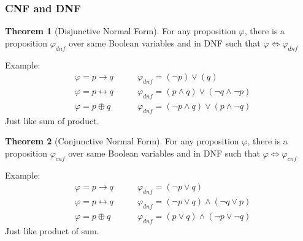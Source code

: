 \documentclass{article}
\theoremstyle{definition}
\newtheorem{theorem}{Theorem}
\begin{document}
\subsubsection{CNF and DNF}
\begin{theorem}[Disjunctive Normal Form]
    For any proposition $ \varphi $, there is a proposition $ \varphi_{dnf} $ over same Boolean variables and in DNF such that $ \varphi \Leftrightarrow \varphi_{dnf} $
\end{theorem}
Example:
\begin{align*}
    & \varphi=p\rightarrow q \qquad &\varphi_{dnf}=(\lnot p)\lor (q)\\
    & \varphi = p \leftrightarrow q &\varphi_{dnf} = (p\land q)\lor (\lnot q \land \lnot p)\\
    & \varphi = p \oplus q &\varphi_{dnf} = (\lnot p \land q)\lor (p\land \lnot q)
\end{align*}
Just like sum of product.
\begin{theorem}[Conjunctive Normal Form]
    For any proposition $ \varphi $, there is a proposition $ \varphi_{cnf} $ over same Boolean variables and in DNF such that $ \varphi \Leftrightarrow \varphi_{cnf} $
\end{theorem}
Example:
\begin{align*}
    & \varphi=p\rightarrow q \qquad &\varphi_{dnf}=(\lnot p\lor q)\\
    & \varphi = p \leftrightarrow q &\varphi_{dnf} = (\lnot p\lor q)\land (\lnot q \lor p)\\
    & \varphi = p \oplus q &\varphi_{dnf} = (p \lor q)\land (\lnot p\lor \lnot q)
\end{align*}
Just like product of sum.
\end{document}
